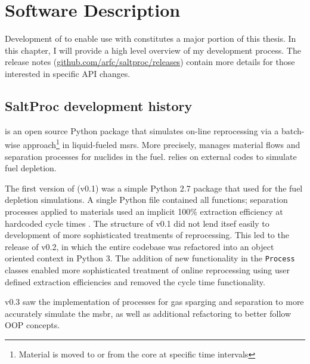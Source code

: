 \chapter{Software Description}
Development of \SaltProc to enable use with \OpenMC constitutes a major portion
of this thesis. In this chapter, I will provide a high level overview
of my development process. The release
notes (\url{github.com/arfc/saltproc/releases}) contain more
details for those interested in specific API changes. 

\section{SaltProc development history}%
\label{sec:saltproc-history}

\SaltProc\cite{rykhlevskii_saltproc_2018} is an open source Python package that
simulates on-line reprocessing via a batch-wise approach\footnote{Material is
moved to or from the core at specific time intervals} in liquid-fueled
\Gls{msr}s. More precisely, \SaltProc manages material flows and separation
processes for nuclides in the fuel. \SaltProc relies on external codes to simulate
fuel depletion.

The first version of \SaltProc (v0.1) was a simple Python 2.7 package that used
\SerpentTWO for the fuel depletion simulations. A single Python file contained
all functions; separation processes applied to materials used an implicit 100\%
extraction efficiency at hardcoded cycle times \cite{rykhlevskii_advanced_2018}.
The structure of \SaltProc v0.1 did not lend itsef easily to development of more
sophisticated treatments of reprocessing. This led to the release of \SaltProc
v0.2, in which the entire codebase was refactored into an object oriented
context in Python 3. The addition of new functionality in the \verb.Process.
classes enabled more sophisticated treatment of online reprocessing using user
defined extraction efficiencies and removed the cycle time functionality\cite{rykhlevskii_fuel_2020}.

\SaltProc v0.3 saw the implementation of processes for gas sparging and
separation to more accurately simulate the \gls{msbr}, as well as additional
refactoring to better follow OOP concepts.

